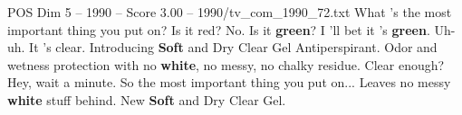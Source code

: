 \begin{textsample}{POS Dim 5 – 1990 – Score 3.00 – 1990/tv\_com\_1990\_72.txt}  \label{ex:f5_pos_021}
What 's the most important thing you put on?
Is it red?
No.
Is it \textbf{green}?
I 'll bet it 's \textbf{green}.
Uh-uh.
It 's clear.
Introducing \textbf{Soft} and Dry Clear Gel Antiperspirant.
Odor and wetness protection with no \textbf{white}, no messy, no chalky residue.
Clear enough?
Hey, wait a minute.
So the most important thing you put on...
Leaves no messy \textbf{white} stuff behind.
New \textbf{Soft} and Dry Clear Gel.

\end{textsample}

